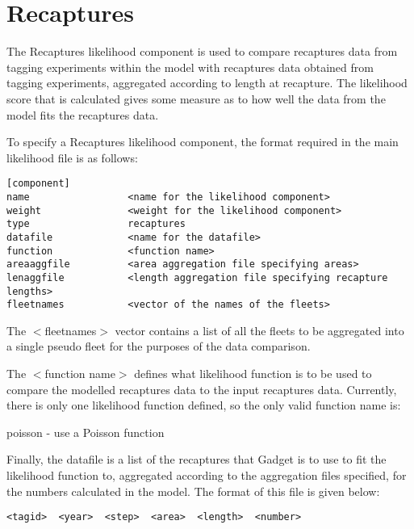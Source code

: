 \documentclass[10pt,twoside]{book}
\begin{document}

\section{Recaptures}\label{sec:recaptures}
The Recaptures likelihood component is used to compare recaptures data from tagging experiments within the model with recaptures data obtained from tagging experiments, aggregated according to length at recapture.  The likelihood score that is calculated gives some measure as to how well the data from the model fits the recaptures data.

\bigskip
To specify a Recaptures likelihood component, the format required in the main likelihood file is as follows:

{\small\begin{verbatim}
[component]
name                 <name for the likelihood component>
weight               <weight for the likelihood component>
type                 recaptures
datafile             <name for the datafile>
function             <function name>
areaaggfile          <area aggregation file specifying areas>
lenaggfile           <length aggregation file specifying recapture lengths>
fleetnames           <vector of the names of the fleets>
\end{verbatim}}

The $<$fleetnames$>$ vector contains a list of all the fleets to be aggregated into a single pseudo fleet for the purposes of the data comparison.

\bigskip
The $<$function name$>$ defines what likelihood function is to be used to compare the modelled recaptures data to the input recaptures data.  Currently, there is only one likelihood function defined, so the only valid function name is:

\bigskip
poisson - use a Poisson function

\bigskip
Finally, the datafile is a list of the recaptures that Gadget is to use to fit the likelihood function to, aggregated according to the aggregation files specified, for the numbers calculated in the model. The format of this file is given below:

{\small\begin{verbatim}
<tagid>  <year>  <step>  <area>  <length>  <number>
\end{verbatim}}
\end{document}
